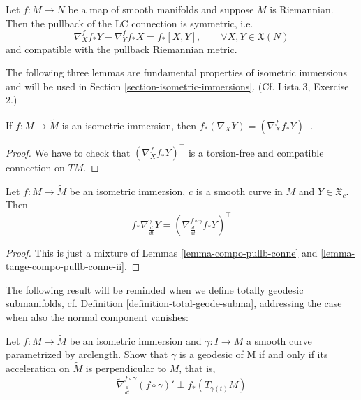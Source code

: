 \documentclass{book}
\begin{document}
\begin{proposition}
\label{proposition-symme-compa}
Let $f:M \to N$ be a map of smooth manifolds
and suppose $M$ is Riemannian.
Then the pullback of the LC connection is
symmetric, i.e.
\begin{equation}
\label{equation-pullb-conne-symme}
\nabla^f_X f_*Y-\nabla^f_Yf_*X =
f_*[X,Y],\qquad
\forall X,Y \in \mathfrak{X}(N)
\end{equation}
and compatible with the pullback Riemannian
metric.
\end{proposition}

The following three lemmas are fundamental
properties of isometric
immersions and will be used in Section
\ref{section-isometric-immersions}. (Cf.
Lista 3, Exercise 2.)

\begin{lemma}
\label{lemma-tange-compo-pullb-conne-ii}
If $f:M \to \tilde{M}$ is an isometric
immersion, then
$f_*(\nabla_XY)=(\nabla^f_Xf_*Y)^\top$.
\end{lemma}

\begin{proof}
We have to check that $(\nabla^f_Xf_*Y)^\top$
is a torsion-free and compatible
connection on $TM$.
\end{proof}

\begin{lemma}
\label{lemma-isometric-immersion-along-curve}
Let $f:M \to \tilde{M}$ be an isometric
immersion, $c$ is a smooth curve in $M$
and $Y\in\mathfrak{X}_c$. Then
$$
f_*\nabla_{\frac{d}{dt}}^\gamma Y
=\left(\nabla^{f\circ\gamma}_{\frac{d}{dt}}
f_*Y\right)^\top
$$
\end{lemma}

\begin{proof}
This is just a mixture of Lemmas
\ref{lemma-compo-pullb-conne}
 and \ref{lemma-tange-compo-pullb-conne-ii}.
\end{proof}

The following result will be reminded when we
define totally geodesic
submanifolds, cf. Definition
\ref{definition-total-geode-subma},
addressing the case when also the normal
component vanishes:

\begin{lemma}
\label{lemma-geodesics-of-submanifold}
Let $f:M \to \tilde{M}$ be an isometric
immersion and $\gamma:I\to M$ a smooth
curve parametrized by arclength. Show that
$\gamma$ is a geodesic of M
if and only if its acceleration on
$\tilde{M}$ is perpendicular to $M$, that is,
$$
\tilde{\nabla}^{f\circ\gamma}_{\frac{d}
{dt}}(f\circ\gamma)'\perp
f_*(T_{\gamma(t)}M)
$$
\end{lemma}
\end{document}
